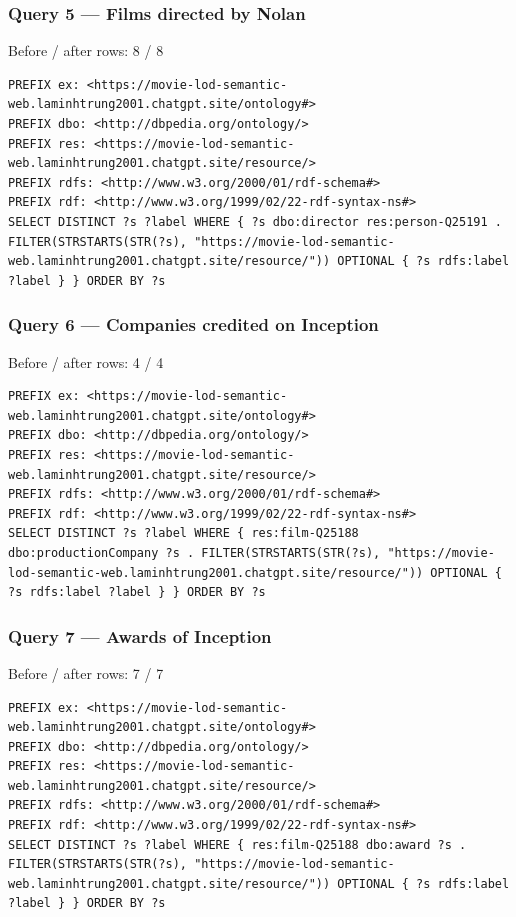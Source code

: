 \documentclass[
  11pt,
]{article}
\begin{document}
\subsubsection{Query 5 --- Films directed by
Nolan}\label{query-5-films-directed-by-nolan}

Before / after rows: 8 / 8

\begin{verbatim}
PREFIX ex: <https://movie-lod-semantic-web.laminhtrung2001.chatgpt.site/ontology#>
PREFIX dbo: <http://dbpedia.org/ontology/>
PREFIX res: <https://movie-lod-semantic-web.laminhtrung2001.chatgpt.site/resource/>
PREFIX rdfs: <http://www.w3.org/2000/01/rdf-schema#>
PREFIX rdf: <http://www.w3.org/1999/02/22-rdf-syntax-ns#>
SELECT DISTINCT ?s ?label WHERE { ?s dbo:director res:person-Q25191 . FILTER(STRSTARTS(STR(?s), "https://movie-lod-semantic-web.laminhtrung2001.chatgpt.site/resource/")) OPTIONAL { ?s rdfs:label ?label } } ORDER BY ?s
\end{verbatim}

\subsubsection{Query 6 --- Companies credited on
Inception}\label{query-6-companies-credited-on-inception}

Before / after rows: 4 / 4

\begin{verbatim}
PREFIX ex: <https://movie-lod-semantic-web.laminhtrung2001.chatgpt.site/ontology#>
PREFIX dbo: <http://dbpedia.org/ontology/>
PREFIX res: <https://movie-lod-semantic-web.laminhtrung2001.chatgpt.site/resource/>
PREFIX rdfs: <http://www.w3.org/2000/01/rdf-schema#>
PREFIX rdf: <http://www.w3.org/1999/02/22-rdf-syntax-ns#>
SELECT DISTINCT ?s ?label WHERE { res:film-Q25188 dbo:productionCompany ?s . FILTER(STRSTARTS(STR(?s), "https://movie-lod-semantic-web.laminhtrung2001.chatgpt.site/resource/")) OPTIONAL { ?s rdfs:label ?label } } ORDER BY ?s
\end{verbatim}

\subsubsection{Query 7 --- Awards of
Inception}\label{query-7-awards-of-inception}

Before / after rows: 7 / 7

\begin{verbatim}
PREFIX ex: <https://movie-lod-semantic-web.laminhtrung2001.chatgpt.site/ontology#>
PREFIX dbo: <http://dbpedia.org/ontology/>
PREFIX res: <https://movie-lod-semantic-web.laminhtrung2001.chatgpt.site/resource/>
PREFIX rdfs: <http://www.w3.org/2000/01/rdf-schema#>
PREFIX rdf: <http://www.w3.org/1999/02/22-rdf-syntax-ns#>
SELECT DISTINCT ?s ?label WHERE { res:film-Q25188 dbo:award ?s . FILTER(STRSTARTS(STR(?s), "https://movie-lod-semantic-web.laminhtrung2001.chatgpt.site/resource/")) OPTIONAL { ?s rdfs:label ?label } } ORDER BY ?s
\end{verbatim}
\end{document}

